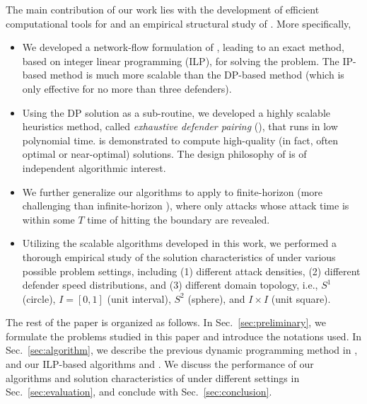 The main contribution of our work lies with the development of efficient computational tools for and an empirical structural study of \prob. More specifically, 
\begin{itemize}[leftmargin=3.5mm]
\item We developed a network-flow formulation of \prob, leading to an exact method, based on integer linear programming (ILP), for solving the problem. The IP-based method is much more scalable than the DP-based method (which is only effective for no more than three defenders). 
\item Using the DP solution as a sub-routine, we developed a highly scalable heuristics method, called \emph{exhaustive defender pairing} (\ours), that runs in low polynomial time.  \ours is demonstrated to compute high-quality (in fact, often optimal or near-optimal) solutions. The design philosophy of \ours is of independent algorithmic interest. 
\item We further generalize our algorithms to apply to finite-horizon \prob (more challenging than infinite-horizon \prob), where only attacks whose attack time is within some $T$ time of hitting the boundary are revealed.
\item Utilizing the scalable algorithms developed in this work, we performed a thorough empirical study of the solution characteristics of \prob under various possible problem settings, including (1) different attack densities, (2) different defender speed distributions, and (3) different domain topology, i.e., $S^1$ (circle), $I = [0, 1]$ (unit interval), $S^2$ (sphere), and $I \times I$ (unit square). 
\end{itemize}


The rest of the paper is organized as follows. 
In Sec.~\ref{sec:preliminary}, we formulate the problems studied in this paper and introduce the notations used. 
In Sec.~\ref{sec:algorithm}, we describe the previous dynamic programming method in \cite{adler2022role}, and our ILP-based algorithms and \ours. 
We discuss the performance of our algorithms and solution characteristics of \prob under different settings in Sec.~\ref{sec:evaluation}, and conclude with Sec.~\ref{sec:conclusion}.

